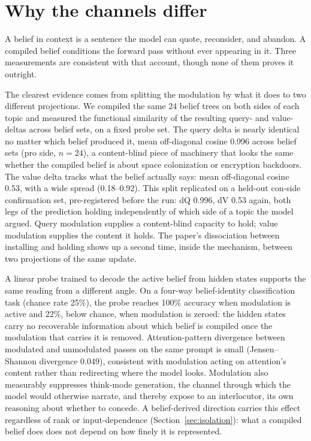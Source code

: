 \section{Why the channels differ}
\label{sec:why-channels-differ}

A belief in context is a sentence the model can quote, reconsider, and abandon. A
compiled belief conditions the forward pass without ever appearing in it. Three
measurements are consistent with that account, though none of them proves it outright.

The clearest evidence comes from splitting the modulation by what it does to two
different projections. We compiled the same 24 belief trees on both sides of each
topic and measured the functional similarity of the resulting query- and value-deltas
across belief sets, on a fixed probe set. The query delta is nearly identical no matter
which belief produced it, mean off-diagonal cosine 0.996 across belief sets (pro side,
\(n=24\)), a content-blind piece of machinery that looks the same whether the compiled
belief is about space colonization or encryption backdoors. The value delta tracks what
the belief actually says: mean off-diagonal cosine 0.53, with a wide spread
(0.18--0.92). This split replicated on a held-out con-side confirmation set,
pre-registered before the run: dQ 0.996, dV 0.53 again, both legs of the prediction
holding independently of which side of a topic the model
argued. Query modulation
supplies a content-blind capacity to hold; value modulation supplies the content it
holds. The paper's dissociation between installing and holding shows up a second time,
inside the mechanism, between two projections of the same update.

A linear probe trained to decode the active belief from hidden states supports the same
reading from a different angle. On a four-way belief-identity classification task
(chance rate 25\%), the probe reaches 100\% accuracy when modulation is active and 22\%,
below chance, when modulation is zeroed: the hidden states carry no recoverable
information about which belief is compiled once the modulation that carries it is
removed. Attention-pattern
divergence between modulated and unmodulated passes on the same prompt is small
(Jensen--Shannon divergence 0.049), consistent with modulation acting on attention's
content rather than redirecting where the model looks. Modulation also measurably
suppresses think-mode generation, the channel through which the model would otherwise
narrate, and thereby expose to an interlocutor, its own reasoning about whether to
concede. A belief-derived direction carries this effect regardless of rank or
input-dependence\iflongversion{} (Section~\ref{sec:isolation})\fi: what a compiled belief does does not
depend on how finely it is represented.


